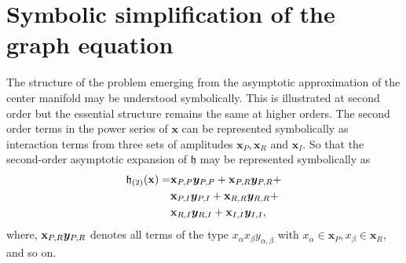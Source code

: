\appendix



\section{Symbolic simplification of the graph equation}
\label{app:AppendixA}

The structure of the problem emerging from the asymptotic approximation of the center manifold may be understood symbolically. This is illustrated at second order but the essential structure remains the same at higher orders. The second order terms in the power series of $\mathbf{x}$ can be represented symbolically as interaction terms from three sets of amplitudes $\mathbf{x}_{P}, \mathbf{x}_{R}$ and $\mathbf{x}_{I}$. So that the second-order asymptotic expansion of $\mathfrak{h}$ may be represented symbolically as
\begin{align}
	\label{eqn:H2_symbolic}
	\begin{split}
		\mathfrak{h}_{(2)}(\mathbf{x}) =
		& \mathbf{x}_{P,P}\boldsymbol{y}_{P,P} + 
		    \mathbf{x}_{P,R}\boldsymbol{y}_{P,R} + \\  
		& \mathbf{x}_{P,I}\boldsymbol{y}_{P,I} + 
		    \mathbf{x}_{R,R}\boldsymbol{y}_{R,R} + \\
		& \mathbf{x}_{R,I}\boldsymbol{y}_{R,I} + 
		    \mathbf{x}_{I,I}\boldsymbol{y}_{I,I},
	\end{split} 
\end{align}
where, $\mathbf{x}_{P,R}\boldsymbol{y}_{P,R}$ denotes all terms of the type $x_{\alpha}x_{\beta}y_{\alpha,\beta}$ with $x_{\alpha}\in \mathbf{x}_{P}, x_{\beta}\in \mathbf{x}_{R}$, and so on.

